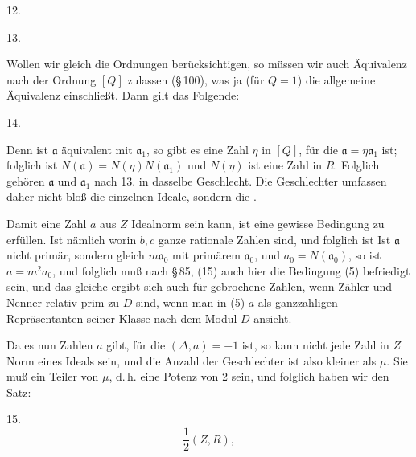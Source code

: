 12. 

13. 

Wollen wir gleich die Ordnungen berücksichtigen, so müssen wir auch Äquivalenz nach der Ordnung $[Q]$ zulassen (\S\,100), was ja (für $Q = 1$) die allgemeine Äquivalenz einschließt. Dann gilt das Folgende:

14. 

Denn ist $\mathfrak{a}$ äquivalent mit $\mathfrak{a}_1$, so gibt es eine Zahl $\eta$ in $[Q]$, für die $\mathfrak{a} = \eta \mathfrak{a}_1$ ist; folglich ist $N(\mathfrak{a}) = N(\eta) N(\mathfrak{a}_1)$ und $N(\eta)$ ist eine Zahl in $R$. Folglich gehören $\mathfrak{a}$ und $\mathfrak{a}_1$ nach 13. in dasselbe Geschlecht. Die Geschlechter umfassen daher nicht bloß die einzelnen Ideale, sondern die .

Damit eine Zahl $a$ aus $Z$ Idealnorm sein kann, ist eine gewisse Bedingung zu erfüllen. Ist nämlich
worin $b, c$ ganze rationale Zahlen sind, und folglich ist
Ist $\mathfrak{a}$ nicht primär, sondern gleich $m \mathfrak{a}_0$ mit primärem $\mathfrak{a}_0$, und $a_0 = N(\mathfrak{a}_0)$, so ist $a = m^2 a_0$, und folglich muß nach \S\,85, (15) auch hier die Bedingung (5) befriedigt sein, und das gleiche ergibt sich auch für gebrochene Zahlen, wenn Zähler und Nenner relativ prim zu $D$ sind, wenn man in (5) $a$ als ganzzahligen Repräsentanten seiner Klasse nach dem Modul $D$ ansieht.

Da es nun Zahlen $a$ gibt, für die $(\Delta, a) = -1$ ist, so kann nicht jede Zahl in $Z$ Norm eines Ideals sein, und die Anzahl der Geschlechter ist also kleiner als $\mu$. Sie muß ein Teiler von $\mu$, d.\,h. eine Potenz von 2 sein, und folglich haben wir den Satz:

15. 
\[
\frac{1}{2} (Z, R),
\]
